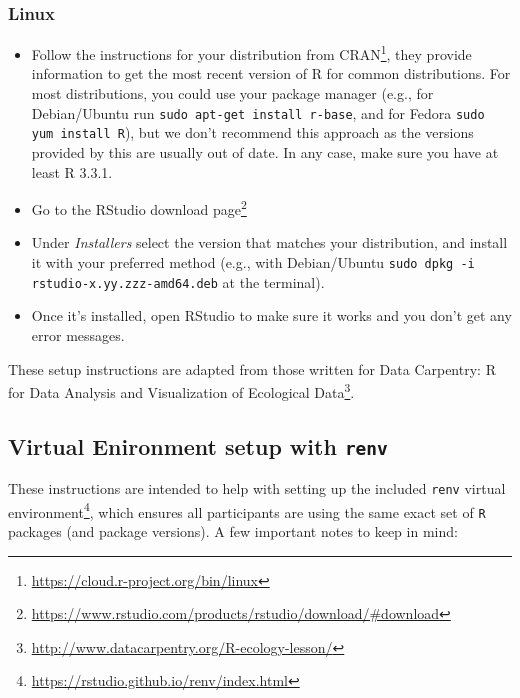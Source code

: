 \documentclass[
  12pt,
]{book}
\newcommand{\passthrough}[1]{#1}
\providecommand{\tightlist}{%
  \setlength{\itemsep}{0pt}\setlength{\parskip}{0pt}}
\renewcommand{\href}[2]{#2\footnote{\url{#1}}}
\theoremstyle{definition}
\theoremstyle{definition}
\theoremstyle{definition}
\newcommand{\1}{\mathbbm{1}}
\begin{document}
\hypertarget{linux}{%
\subsubsection{Linux}\label{linux}}

\begin{itemize}
\tightlist
\item
  Follow the instructions for your distribution from
  \href{https://cloud.r-project.org/bin/linux}{CRAN}, they provide information to get
  the most recent version of R for common distributions. For most distributions,
  you could use your package manager (e.g., for Debian/Ubuntu run \passthrough{\lstinline!sudo apt-get install r-base!}, and for Fedora \passthrough{\lstinline!sudo yum install R!}), but we don't recommend
  this approach as the versions provided by this are usually out of date. In any
  case, make sure you have at least R 3.3.1.
\item
  Go to the \href{https://www.rstudio.com/products/rstudio/download/\#download}{RStudio download
  page}
\item
  Under \emph{Installers} select the version that matches your distribution, and
  install it with your preferred method (e.g., with Debian/Ubuntu \passthrough{\lstinline!sudo dpkg -i rstudio-x.yy.zzz-amd64.deb!} at the terminal).
\item
  Once it's installed, open RStudio to make sure it works and you don't get any
  error messages.
\end{itemize}

These setup instructions are adapted from those written for \href{http://www.datacarpentry.org/R-ecology-lesson/}{Data Carpentry: R
for Data Analysis and Visualization of Ecological
Data}.

\hypertarget{renv}{%
\subsection{\texorpdfstring{Virtual Enironment setup with \texttt{renv}}{Virtual Enironment setup with renv}}\label{renv}}

These instructions are intended to help with setting up the included \href{https://rstudio.github.io/renv/index.html}{\passthrough{\lstinline!renv!}
virtual environment}, which ensures
all participants are using the same exact set of \passthrough{\lstinline!R!} packages (and package
versions). A few important notes to keep in mind:
\end{document}
